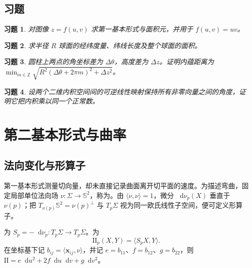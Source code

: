 \documentclass[UTF8,12pt,a4paper,fontset=fandol]{ctexbook}
\newcommand{\dd}{\mathop{}\!\mathrm d}
\newcommand{\ip}[2]{\langle #1,#2\rangle}
\newtheorem{exercise}{习题}[chapter]
\begin{document}
\section{习题}
\begin{exercise}\label{ex:dg-metric-graph}
对图像 $z=f(u,v)$ 求第一基本形式与面积元，并用于 $f(u,v)=uv$。
\end{exercise}
\begin{exercise}\label{ex:dg-metric-sphere}
求半径 $R$ 球面的经纬度量、纬线长度及整个球面的面积。
\end{exercise}
\begin{exercise}\label{ex:dg-metric-cylinder}
圆柱上两点的角坐标差为 $\Delta\theta$，高度差为 $\Delta z$。证明内蕴距离为 $\min_{m\in\mathbb Z}\sqrt{R^2(\Delta\theta+2\pi m)^2+\Delta z^2}$。
\end{exercise}
\begin{exercise}\label{ex:dg-metric-conformal}
设两个二维内积空间间的可逆线性映射保持所有非零向量之间的角度，证明它把内积乘以同一个正常数。
\end{exercise}

\chapter{第二基本形式与曲率}
\label{chap:dg-curvature}

\section{法向变化与形算子}
第一基本形式测量切向量，却未直接记录曲面离开切平面的速度。为描述弯曲，固定局部单位法向场 $\nu:\Sigma\to\mathbb S^2$，称为。由 $\ip\nu\nu=1$，微分 $\dd\nu_p(X)$ 垂直于 $\nu(p)$；把 $T_{\nu(p)}\mathbb S^2=\nu(p)^\perp$ 与 $T_p\Sigma$ 视为同一欧氏线性子空间，便可定义形算子。

\begin{definition}[形算子与第二基本形式]
为 $S_p=-\dd\nu_p:T_p\Sigma\to T_p\Sigma$。为
\[
 \mathrm{II}_p(X,Y)=\ip{S_pX}{Y}.
\]
在坐标基下记 $b_{ij}=\ip{\mathbf x_{ij}}\nu$，并记 $e=b_{11}$、$f=b_{12}$、$g=b_{22}$，则 $\mathrm{II}=e\dd u^2+2f\dd u\dd v+g\dd v^2$。
\end{definition}
\end{document}
